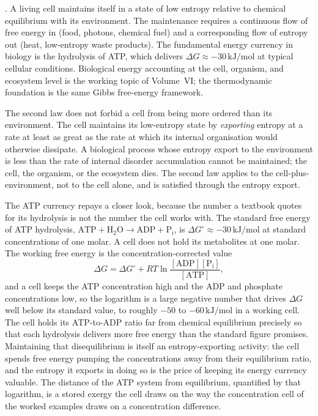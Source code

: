 . A living cell maintains itself in a
state of low entropy relative to chemical equilibrium with its
environment. The maintenance requires a continuous flow of free
energy in (food, photons, chemical fuel) and a corresponding flow of
entropy out (heat, low-entropy waste products). The fundamental
energy currency in biology is the hydrolysis of ATP, which delivers
$\Delta G \approx -30\,\text{kJ}/\text{mol}$ at typical cellular
conditions. Biological energy accounting at the cell, organism, and
ecosystem level is the working topic of Volume~VI; the
thermodynamic foundation is the same Gibbs free-energy framework.

The second law does not forbid a cell from being more ordered than
its environment. The cell maintains its low-entropy state by
\emph{exporting} entropy at a rate at least as great as the rate at
which its internal organisation would otherwise dissipate. A
biological process whose entropy export to the environment is less
than the rate of internal disorder accumulation cannot be
maintained; the cell, the organism, or the ecosystem dies. The
second law applies to the cell-plus-environment, not to the cell
alone, and is satisfied through the entropy export.

The ATP currency repays a closer look, because the number a textbook quotes for
its hydrolysis is not the number the cell works with. The standard free energy of
ATP hydrolysis, $\text{ATP} + \text{H}_2\text{O} \to \text{ADP} +
\text{P}_\text{i}$, is $\Delta G^\circ \approx -30\,\text{kJ}/\text{mol}$ at
standard concentrations of one molar. A cell does not hold its metabolites at one
molar. The working free energy is the concentration-corrected value
\[
\Delta G = \Delta G^\circ + RT\ln\frac{[\text{ADP}][\text{P}_\text{i}]}
{[\text{ATP}]},
\]
and a cell keeps the ATP concentration high and the ADP and phosphate
concentrations low, so the logarithm is a large negative number that drives
$\Delta G$ well below its standard value, to roughly $-50$ to
$-60\,\text{kJ}/\text{mol}$ in a working cell. The cell holds its ATP-to-ADP
ratio far from chemical equilibrium precisely so that each hydrolysis delivers
more free energy than the standard figure promises. Maintaining that
disequilibrium is itself an entropy-exporting activity: the cell spends free
energy pumping the concentrations away from their equilibrium ratio, and the
entropy it exports in doing so is the price of keeping its energy currency
valuable. The distance of the ATP system from equilibrium, quantified by that
logarithm, is a stored exergy the cell draws on the way the concentration cell of
the worked examples draws on a concentration difference.

